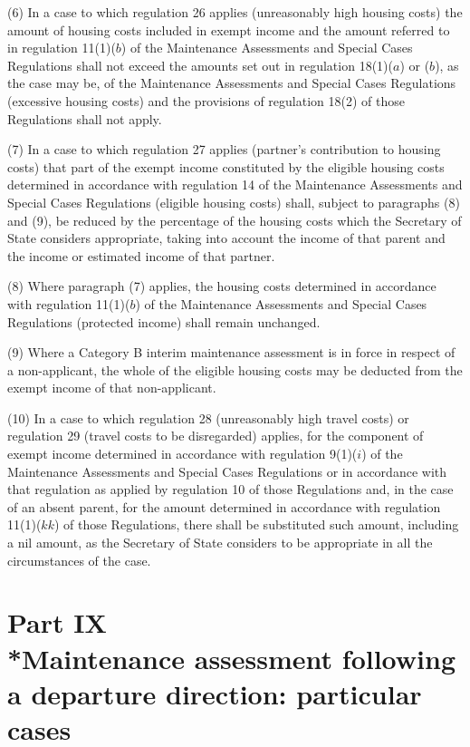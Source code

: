 \documentclass[12pt,a4paper]{article}
\begin{document}
(6) In a case to which regulation 26 applies (unreasonably high housing costs)
the amount of housing costs included in exempt income and the amount referred to
in regulation 11(1)($b$) of the Maintenance Assessments and Special Cases
Regulations shall not exceed the amounts set out in regulation 18(1)($a$) or ($b$),
as the case may be, of the Maintenance Assessments and Special Cases Regulations
(excessive housing costs) and the provisions of regulation 18(2) of those
Regulations shall not apply.

(7) In a case to which regulation 27 applies (partner’s contribution to housing
costs) that part of the exempt income constituted by the eligible housing costs
determined in accordance with regulation 14 of the Maintenance Assessments and
Special Cases Regulations (eligible housing costs) shall, subject to paragraphs
(8) and (9), be reduced by the percentage of the housing costs which the
Secretary of State considers appropriate, taking into account the income of that
parent and the income or estimated income of that partner.

(8) Where paragraph (7) applies, the housing costs determined in accordance with
regulation 11(1)($b$) of the Maintenance Assessments and Special Cases Regulations
(protected income) shall remain unchanged.

(9) Where a Category B interim maintenance assessment is in force in respect of
a non-applicant, the whole of the eligible housing costs may be deducted from
the exempt income of that non-applicant.

(10) In a case to which regulation 28 (unreasonably high travel costs) or
regulation 29 (travel costs to be disregarded) applies, for the component of
exempt income determined in accordance with regulation 9(1)($i$) of the
Maintenance Assessments and Special Cases Regulations or in accordance with that
regulation as applied by regulation 10 of those Regulations and, in the case of
an absent parent, for the amount determined in accordance with regulation
11(1)($kk$) of those Regulations, there shall be substituted such amount,
including a nil amount, as the Secretary of State considers to be appropriate in
all the circumstances of the case.


\section[Part IX --- Maintenance assessment following a departure direction: particular cases]{\sloppy Part IX\\*Maintenance assessment following a departure direction: particular cases}
\end{document}
